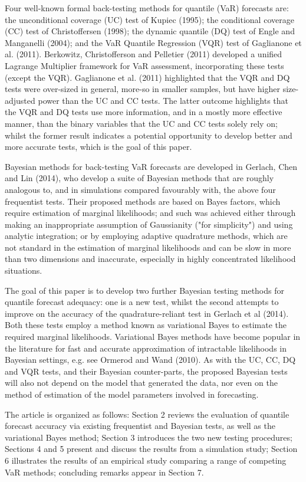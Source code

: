 \documentclass[12pt,epsf]{article}
\begin{document}
Four well-known formal back-testing methods for quantile (VaR) forecasts are: the unconditional coverage (UC) test of Kupiec (1995); the
conditional coverage (CC) test of Christoffersen (1998); the dynamic quantile (DQ) test of Engle and Manganelli (2004); and the VaR Quantile
Regression (VQR) test of Gaglianone et al. (2011). Berkowitz, Christofferson and Pelletier (2011) developed a unified Lagrange
Multiplier framework for VaR assessment, incorporating these tests (except the VQR). Gaglianone et al. (2011) highlighted that the
VQR and DQ tests were over-sized in general, more-so in smaller samples, but have higher size-adjusted power than the UC and CC tests.
The latter outcome highlights that the VQR and DQ tests use more information, and in a mostly more effective manner, than the binary
variables that the UC and CC tests solely rely on; whilst the former result indicates a potential opportunity to develop better
and more accurate tests, which is the goal of this paper.

Bayesian methods for back-testing VaR forecasts are developed in Gerlach, Chen and Lin (2014), who develop a suite of
Bayesian methods that are roughly analogous to, and in simulations compared favourably with, the above four frequentist tests.
Their proposed methods are based on Bayes factors, which require estimation of marginal likelihoods; and such was achieved either
through making an inappropriate assumption of Gaussianity ("for simplicity") and using analytic integration; or by
employing adaptive quadrature methods, which are not standard in the estimation of marginal likelihoods and can be slow
in more than two dimensions and inaccurate, especially in highly concentrated likelihood situations.

The goal of this paper is to develop two further Bayesian testing methods for quantile forecast adequacy: one is a new test,
whilst the second attempts to improve on the accuracy of the quadrature-reliant test in Gerlach et al (2014). Both these tests
employ a method known as variational Bayes to estimate the required marginal likelihoods. Variational Bayes methods have become
popular in the literature for fast and accurate approximation of intractable likelihoods in Bayesian settings, e.g. see Ormerod and
Wand (2010). As with the UC, CC, DQ and VQR tests, and their Bayesian counter-parts, the proposed Bayesian tests will also not
depend on the model that generated the data, nor even on the method of estimation of the model parameters involved in forecasting.

The article is organized as follows: Section 2 reviews the evaluation of quantile forecast accuracy via existing frequentist
and Bayesian tests, as well as the variational Bayes method; Section 3 introduces the two new testing procedures;
Sections 4 and 5 present and discuss the results from a simulation study; Section 6 illustrates the results of an
empirical study comparing a range of competing VaR methods; concluding remarks appear in Section 7.
\end{document}
